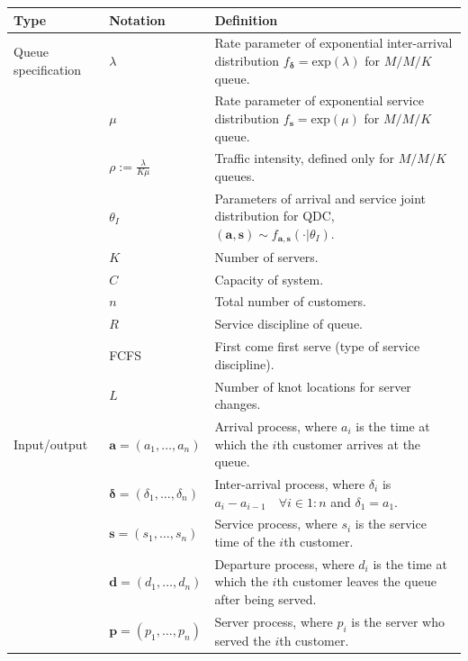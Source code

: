 \documentclass[article]{jss}
\begin{document}
\begin{table}
\centering
\begin{tabular}{llp{14cm}}
\hline
Type & Notation & Definition \\
\hline

Queue specification

& $\lambda$ & Rate parameter of exponential inter-arrival distribution $f_{\boldsymbol{\delta}} = \text{exp}(\lambda)$ for $M/M/K$ queue. \\
& $\mu$ & Rate parameter of exponential service distribution $f_{\mathbf{s}} = \text{exp}(\mu)$ for $M/M/K$ queue.  \\
& $\rho := \frac{\lambda}{K \mu}$ & Traffic intensity, defined only for $M/M/K$ queues. \\ 
& $\theta_{I}$ & Parameters of arrival and service joint distribution for QDC, $(\mathbf{a}, \mathbf{s}) \sim f_{\mathbf{a}, \mathbf{s}}(\cdot | \theta_I )$. \\

& $K$ & Number of servers. \\
& $C$ & Capacity of system.  \\
& $n$ & Total number of customers. \\
& $R$ & Service discipline of queue. \\
& FCFS & First come first serve (type of service discipline). \\
& $L$ & Number of knot locations for server changes. \\

\hline

Input/output
& $\mathbf{a} = (a_1, \ldots, a_n )$ & Arrival process, where $a_i$ is the time at which the $i$th customer arrives at the queue. \\

& $\boldsymbol{\delta} = (\delta_1, \ldots, \delta_n )$ & Inter-arrival process, where $\delta_i$ is $a_i - a_{i-1} \quad \forall i \in 1:n$ and $\delta_1 = a_1$. \\

& $\mathbf{s} = (s_1, \ldots, s_n )$ & Service process, where $s_i$ is the service time of the $i$th customer. \\

& $\mathbf{d} = (d_1, \ldots, d_n )$ & Departure process, where $d_i$ is the time at which the $i$th customer leaves the queue after being served. \\

& $\mathbf{p} = (p_1, \ldots, p_n )$ & Server process, where $p_i$ is the server who served the $i$th customer. \\


\end{tabular}
\end{table}
\end{document}
